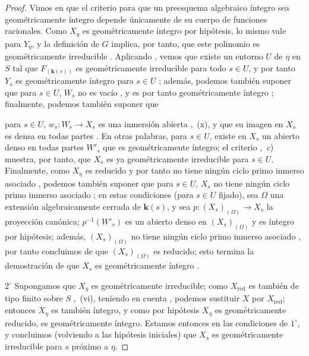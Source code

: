 \begin{proof}
Vimos en  que el criterio para que un preesquema algebraico íntegro sea geométricamente íntegro depende únicamente de su cuerpo de funciones racionales. Como $X_\eta$ es geométricamente íntegro por hipótesis, lo mismo vale para $Y_\eta$, y la definición de $G$ implica, por tanto, que este polinomio es geométricamente irreducible .
Aplicando , vemos que existe un entorno $U$ de $\eta$ en $S$ tal que $F_{(\mathbf{k}(s))}$ es geométricamente irreducible para todo $s\in U$, y por tanto $Y_s$ es geométricamente íntegro para $s\in U$ ; además, podemos también suponer que para $s\in U$, $W_s$ no es vacío , y es por tanto geométricamente íntegro ; finalmente, podemos también suponer que


para $s\in U$, $w_s:W_s\to X_s$ es una inmersión abierta ,~(x), y que su imagen en $X_s$ es densa en todas partes .
En otras palabras, para $s\in U$, existe en $X_s$ un abierto denso en todas partes $W'_s$ que es geométricamente íntegro; el criterio ,~\emph{c}) muestra, por tanto, que $X_s$ es ya geométricamente irreducible para $s\in U$.
Finalmente, como $X_\eta$ es reducido y por tanto no tiene ningún ciclo primo inmerso asociado , podemos también suponer que para $s\in U$, $X_s$ no tiene ningún ciclo primo inmerso asociado ; en estas condiciones (para $s\in U$ fijado), sea $\Omega$ una extensión algebraicamente cerrada de $\boldsymbol{k}(s)$, y sea $p:(X_s)_{(\Omega)}\to X_s$ la proyección canónica; $p^{-1}(W'_s)$ es un abierto denso en $(X_s)_{(\Omega)}$  y es íntegro por hipótesis; además, $(X_s)_{(\Omega)}$ no tiene ningún ciclo primo inmerso asociado , por tanto concluimos de  que $(X_s)_{(\Omega)}$ es reducido; esto termina la demostración de que $X_s$ es geométricamente íntegro .

$2^\circ$ Supongamos que $X_\eta$ es geométricamente irreducible; como $X_{\mathrm{red}}$ es también de tipo finito sobre $S$ ,~(vi), teniendo en cuenta , podemos sustituir $X$ por $X_{\mathrm{red}}$; entonces $X_\eta$ es también íntegro, y como por hipótesis $X_\eta$ es geométricamente reducido, es geométricamente íntegro. Estamos entonces en las condiciones de $1^\circ$, y concluimos (volviendo a las hipótesis iniciales) que $X_s$ es geométricamente irreducible para $s$ próximo a $\eta$.


\end{proof}
